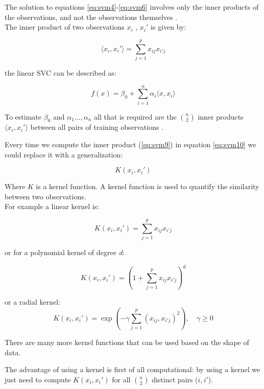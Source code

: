 The solution to equations \ref{eq:svm4}-\ref{eq:svm6} involves only the inner products of the observations, and not the observations themselves \cite{ISLR}.\\
The inner product of two observations $x_i$ , $x_i'$ is given by:

\begin{equation} \label{eq:svm9}
\langle x_i, x_i' \rangle = \sum_{j=1}^{p} x_{ij}x_{i'j}
\end{equation}

the linear SVC can be described as:

\begin{equation} \label{eq:svm10}
f(x) = \beta_0 + \sum_{i=1}^{n} \alpha_i \langle x, x_i \rangle
\end{equation}

To estimate $\beta_{0}$ and $\alpha_1 \dots, \alpha_n$ all that is required are the $n \choose 2$ inner products $\langle x_i, x_i' \rangle$ between all pairs of training observations \cite{ISLR}.

Every time we compute the inner product (\ref{eq:svm9}) in equation \ref{eq:svm10} we could replace it with a generalization:

\begin{equation} \label{eq:svm11}
K(x_i, x_i')
\end{equation}

Where $K$ is a kernel function. A kernel function is used to quantify the similarity between two observations. \\
For example a linear kernel is:

\begin{equation} \label{eq:svm12}
K(x_i, x_i') = \sum_{j=1}^{p} x_{ij}x_{i'j}
\end{equation}

or for a polynomial kernel of degree \textit{d}:

\begin{equation} \label{eq:svm13}
K(x_i, x_i') = (1 + \sum_{j=1}^{p} x_{ij}x_{i'j})^d
\end{equation}

or a radial kernel:
\begin{equation} \label{eq:svm14}
K(x_i, x_i') = \exp(-\gamma\sum_{j=1}^{p} (x_{ij}, x_{i'j})^2), \quad \gamma \ge 0
\end{equation} 

There are many more kernel functions that can be used based on the shape of data.

The advantage of using a kernel is first of all computational: by using a kernel we just need to compute $K(x_i, x_i')$ for all $n \choose 2$ distinct pairs ($i, i'$).

